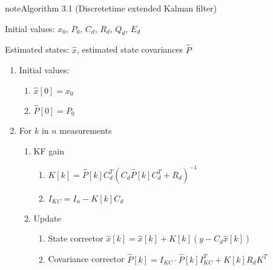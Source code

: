 \documentclass[review]{elsarticle}
\begin{document}
\begin{sphinxadmonition}{note}{Algorithm 3.1 (Discrete\sphinxhyphen{}time extended Kalman filter)}



\sphinxAtStartPar
{} Initial values: \(x_0\), \(P_0\), \(C_d\), \(R_d\), \(Q_d\), \(E_d\)

\sphinxAtStartPar
{} Estimated states: \(\hat{x}\), estimated state covariances \(\hat{P}\)
\begin{enumerate}
%
\item {} 
\sphinxAtStartPar
Initial values:
\begin{enumerate}
%
\item {} 
\sphinxAtStartPar
\(\hat{x}[0] = x_0\)

\item {} 
\sphinxAtStartPar
\(\hat{P}[0] = P_0\)

\end{enumerate}

\item {} 
\sphinxAtStartPar
For \(k\) in \(n\) measurements
\begin{enumerate}
%
\item {} 
\sphinxAtStartPar
KF gain
\begin{enumerate}
%
\item {} 
\sphinxAtStartPar
\(K[k]=\hat{P}[k] C_d^T \left(C_d \hat{P}[k] C_d^T + R_d\right)^{-1}\)

\item {} 
\sphinxAtStartPar
\(I_{KC} = I_n - K[k] C_d\)

\end{enumerate}

\item {} 
\sphinxAtStartPar
Update
\begin{enumerate}
%
\item {} 
\sphinxAtStartPar
State corrector
\(\hat{x}[k] = \hat{x}[k] + K[k] (y - C_d \hat{x}[k]) \)

\item {} 
\sphinxAtStartPar
Covariance corrector
\(\hat{P}[k] = I_{KC} \cdot \hat{P}[k] I_{KC}^T + K[k] R_d K^T \)

\end{enumerate}


\end{enumerate}
\end{enumerate}
\end{sphinxadmonition}
\end{document}
